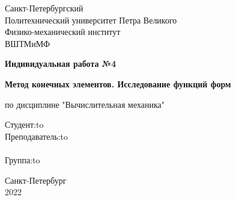 \documentclass[12pt]{article}
\begin{document}
\begin{titlepage}
\Large

\begin{center}
Санкт-Петербургский \\ Политехнический университет Петра Великого\\
Физико-механический институт\\
ВШТМиМФ

\vspace{12em}

\textbf{Индивидуальная работа №4}

\textbf{Метод конечных элементов. Исследование функций форм}

по дисциплине "Вычислительная механика"
\end{center}

\vspace{6em}

\newbox{\lbox}
\newlength{\maxl}
\setlength{\maxl}{\wd\lbox}
\hfill\parbox{14cm}{
\hspace*{5cm}\hspace*{-5cm}Студент:\hfill\hbox to\\
\hspace*{5cm}\hspace*{-5cm}Преподаватель:\hfill\hbox to\\
\\
\hspace*{5cm}\hspace*{-5cm}Группа:\hfill\hbox to\\
}

\vspace{\fill}

\begin{center}
Санкт-Петербург \\2022
\end{center}

\end{titlepage}
\end{document}
